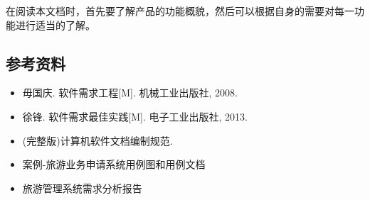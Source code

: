 在阅读本文档时，首先要了解产品的功能概貌，然后可以根据自身的需要对每一功能进行适当的了解。

\subsection{参考资料}
\begin{itemize}
\item{毋国庆. 软件需求工程[M]. 机械工业出版社, 2008.}
\item{徐锋. 软件需求最佳实践[M]. 电子工业出版社, 2013.}
\item{(完整版)计算机软件文档编制规范.}
\item{案例-旅游业务申请系统用例图和用例文档}
\item{旅游管理系统需求分析报告}
\end{itemize}



















